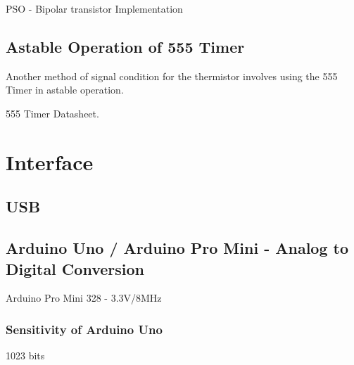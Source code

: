 PSO - Bipolar transistor Implementation \cite{psotutorial}

\subsection{Astable Operation of 555 Timer}

Another method of signal condition for the thermistor involves using the 555 Timer in astable operation. 

555 Timer Datasheet. 

\section{Interface}

\subsection{USB}

\subsection{Arduino Uno / Arduino Pro Mini - Analog to Digital Conversion}
\label{arduino}

Arduino Pro Mini 328 - 3.3V/8MHz

\subsubsection{Sensitivity of Arduino Uno} 

1023 bits